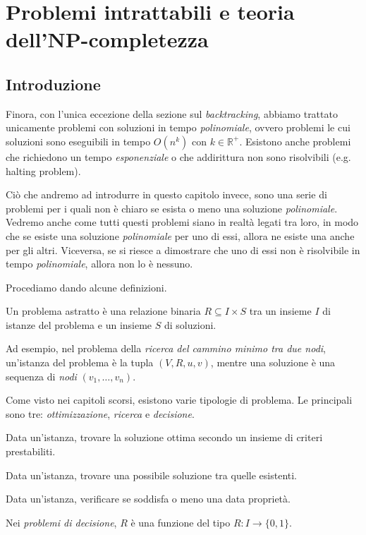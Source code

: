 \chapter{Problemi intrattabili e teoria dell'NP-completezza}
\section{Introduzione}
Finora, con l'unica eccezione della sezione sul \emph{backtracking}, abbiamo
trattato unicamente problemi con soluzioni in tempo \emph{polinomiale}, ovvero
problemi le cui soluzioni sono eseguibili in tempo $O(n^k)$ con $k\in\mathbb{R}^+$.
Esistono anche problemi che richiedono un tempo \emph{esponenziale} o che
addirittura non sono risolvibili (e.g. halting problem).

Ciò che andremo ad introdurre in questo capitolo invece, sono una serie di
problemi per i quali non è chiaro se esista o meno una soluzione
\emph{polinomiale}. Vedremo anche come tutti questi problemi siano in realtà
legati tra loro, in modo che se esiste una soluzione \emph{polinomiale} per uno
di essi, allora ne esiste una anche per gli altri. Viceversa, se si riesce a
dimostrare che uno di essi non è risolvibile in tempo \emph{polinomiale}, allora
non lo è nessuno.

\bigskip\noindent
Procediamo dando alcune definizioni.

\begin{definition}
    Un problema astratto è una relazione binaria $R\subseteq I\times S$ tra un
    insieme $I$ di istanze del problema e un insieme $S$ di soluzioni.
\end{definition}
\begin{note}
    Ad esempio, nel problema della \emph{ricerca del cammino minimo tra due
    nodi}, un'istanza del problema è la tupla $(V,R,u,v)$, mentre una soluzione
    è una sequenza di \emph{nodi} $(v_1,\dots,v_n)$.
\end{note}

\noindent
Come visto nei capitoli scorsi, esistono varie tipologie di problema. Le
principali sono tre: \emph{ottimizzazione}, \emph{ricerca} e \emph{decisione}.

\begin{definition}
    Data un'istanza, trovare la soluzione ottima secondo un insieme di criteri
    prestabiliti.
\end{definition}
\begin{definition}
    Data un'istanza, trovare una possibile soluzione tra quelle esistenti.
\end{definition}
\begin{definition}
    Data un'istanza, verificare se soddisfa o meno una data proprietà.
\end{definition}
\begin{note}
    Nei \emph{problemi di decisione}, $R$ è una funzione del tipo $R:I\to\{0,1\}$.
\end{note}

